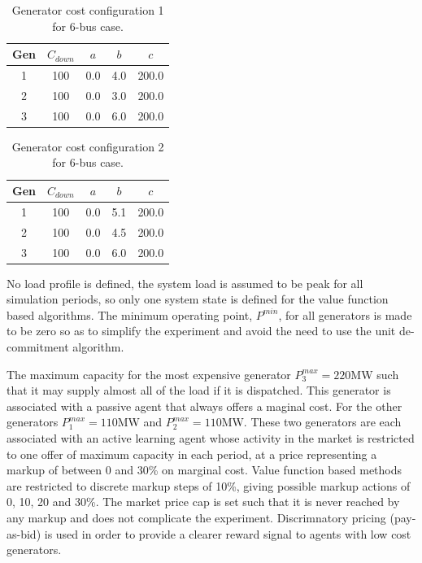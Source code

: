 
\begin{table}
\begin{center}
\begin{tabular}{c|c|c|c|c}
\hline
Gen &$C_{down}$ &$a$ &$b$ &$c$ \\
\hline\hline
 1 &100 &0.0 &4.0 &200.0 \\
 2 &100 &0.0 &3.0 &200.0 \\
 3 &100 &0.0 &6.0 &200.0 \\
\hline
\end{tabular}
\caption{Generator cost configuration 1 for 6-bus case.}
\label{tbl:case6ww_gencost1}
\end{center}
\end{table}

\begin{table}
\begin{center}
\begin{tabular}{c|c|c|c|c}
\hline
Gen &$C_{down}$ &$a$ &$b$ &$c$ \\
\hline\hline
 1 &100 &0.0 &5.1 &200.0 \\
 2 &100 &0.0 &4.5 &200.0 \\
 3 &100 &0.0 &6.0 &200.0 \\
\hline
\end{tabular}
\caption{Generator cost configuration 2 for 6-bus case.}
\label{tbl:case6ww_gencost2}
\end{center}
\end{table}

No load profile is defined, the system load is assumed to be peak for all
simulation periods, so only one system state is defined for the value function
based algorithms.  The minimum operating point, $P^{min}$, for all generators
is made to be zero so as to simplify the experiment and avoid the need to
use the unit de-commitment algorithm.

The maximum capacity for the most expensive generator $P^{max}_3=220$MW such
that it may supply almost all of the load if it is dispatched.  This
generator is associated with a passive agent that always offers a maginal
cost.  For the other generators $P^{max}_1=110$MW and $P^{max}_2=110$MW.  These
two generators are each associated with an active learning agent whose activity
in the market is restricted to one offer of maximum capacity in each period,
at a price representing a markup of between 0 and 30\% on marginal cost.
Value function based methods are restricted to discrete markup steps of 10\%,
giving possible markup actions of 0, 10, 20 and 30\%. The market price cap is
set such that it is never reached by any markup and does not complicate the
experiment.  Discrimnatory pricing (pay-as-bid) is used in order to provide a
clearer reward signal to agents with low cost generators.

